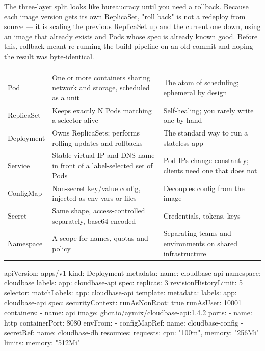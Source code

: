  The three-layer split looks like bureaucracy until you need a rollback. Because each image version gets its own ReplicaSet, "roll back" is not a redeploy from source --- it is scaling the previous ReplicaSet up and the current one down, using an image that already exists and Pods whose spec is already known good. Before this, rollback meant re-running the build pipeline on an old commit and hoping the result was byte-identical.

\begin{center}\small
\wbrowcolors
\begin{tabularx}{\linewidth}{@{}L{24mm} X L{34mm}@{}}
 &  & \\
Pod & One or more containers sharing network and storage, scheduled as a unit & The atom of scheduling; ephemeral by design\\
ReplicaSet & Keeps exactly N Pods matching a selector alive & Self-healing; you rarely write one by hand\\
Deployment & Owns ReplicaSets; performs rolling updates and rollbacks & The standard way to run a stateless app\\
Service & Stable virtual IP and DNS name in front of a label-selected set of Pods & Pod IPs change constantly; clients need one that does not\\
ConfigMap & Non-secret key/value config, injected as env vars or files & Decouples config from the image\\
Secret & Same shape, access-controlled separately, base64-encoded & Credentials, tokens, keys\\
Namespace & A scope for names, quotas and policy & Separating teams and environments on shared infrastructure\\
\end{tabularx}
\end{center}

\begin{k8sbox}
apiVersion: apps/v1
kind: Deployment
metadata:
  name: cloudbase-api
  namespace: cloudbase
  labels: { app: cloudbase-api }
spec:
  replicas: 3
  revisionHistoryLimit: 5
  selector:
    matchLabels: { app: cloudbase-api }
  template:
    metadata:
      labels: { app: cloudbase-api }
    spec:
      securityContext:
        runAsNonRoot: true
        runAsUser: 10001
      containers:
        - name: api
          image: ghcr.io/aymix/cloudbase-api:1.4.2
          ports:
            - name: http
              containerPort: 8080
          envFrom:
            - configMapRef: { name: cloudbase-config }
            - secretRef:    { name: cloudbase-db }
          resources:
            requests: { cpu: "100m", memory: "256Mi" }
            limits:   {            memory: "512Mi" }
\end{k8sbox}

